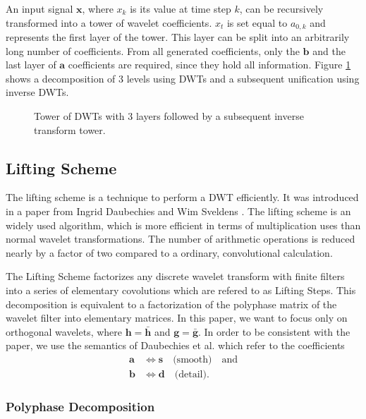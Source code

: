 \begin{refsection}
An input signal $\bm x$, where $x_k$ is its value at time step $k$, can be recursively transformed into a tower of wavelet coefficients.
$x_t$ is set equal to $a_{0,k}$ and represents the first layer of the tower.
This layer can be split into an arbitrarily long number of coefficients.
From all generated coefficients, only the $\bm b$ and the last layer of $\bm a$ coefficients are required, since they hold all information. %
Figure \ref{fpga:fig:dwtTower} shows a decomposition of 3 levels using DWTs and a subsequent unification using inverse DWTs.
\begin{figure}
	\centering
	
	\caption{Tower of DWTs with 3 layers followed by a subsequent inverse transform tower.}
	\label{fpga:fig:dwtTower}
\end{figure}


\subsection{Lifting Scheme}

The lifting scheme is a technique to perform a DWT efficiently.
It was introduced in a paper from Ingrid Daubechies and Wim Sveldens \cite{fpga:Daubechies1998}. 
The lifting scheme is an widely used algorithm, which is more efficient in terms of multiplication uses than normal wavelet transformations.
The number of arithmetic operations is reduced nearly by a factor of two compared to a ordinary, convolutional calculation.

The Lifting Scheme factorizes any discrete wavelet transform with finite filters into a series of elementary covolutions which are refered to as Lifting Steps.
This decomposition is equivalent to a factorization of the polyphase matrix of the wavelet filter into elementary matrices. 
In this paper, we want to focus only on orthogonal wavelets, where $\bm h = \bm{\bar h}$ and $\bm g = \bm{\bar g}$.
In order to be consistent with the paper, we use the semantics of Daubechies et al. which refer to the coefficients
\begin{align}
\bm a & \iff \bm s \quad \text{(smooth)} \quad \text{and} \\
\bm b & \iff \bm d \quad \text{(detail)} .
\end{align}

\subsubsection{Polyphase Decomposition \label{fpga:polyphase}}


\end{refsection}
